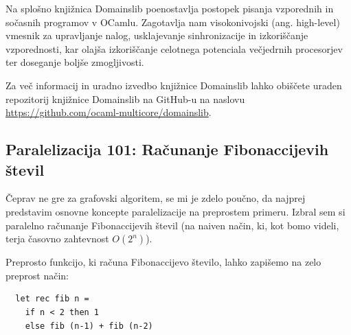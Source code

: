 \documentclass[mat1, tisk]{fmfdelo}
\begin{document}
Na splošno knjižnica Domainslib poenostavlja postopek pisanja vzporednih in sočasnih programov v OCamlu. 
Zagotavlja nam visokonivojski (ang. high-level) vmesnik za upravljanje nalog, usklajevanje sinhronizacije in izkoriščanje vzporednosti, 
kar olajša izkoriščanje celotnega potenciala večjedrnih procesorjev ter doseganje boljše zmogljivosti.

Za več informacij in uradno izvedbo knjižnice Domainslib lahko obiščete uraden repozitorij knjižnice Domainslib na
GitHub-u na naslovu \url{https://github.com/ocaml-multicore/domainslib}.


\subsection{Paralelizacija 101: Računanje Fibonaccijevih števil}

Čeprav ne gre za grafovski algoritem, se mi je zdelo poučno, da najprej predstavim osnovne koncepte paralelizacije na preprostem primeru. 
Izbral sem si paralelno računanje Fibonaccijevih števil (na naiven način, ki, kot bomo videli, terja časovno zahtevnost $O(2^n)$).

Preprosto funkcijo, ki računa Fibonaccijevo število, lahko zapišemo na zelo preprost način:

\begin{lstlisting}
  let rec fib n =
    if n < 2 then 1
    else fib (n-1) + fib (n-2)
\end{lstlisting}

\begin{figure}[htb]
  \centering
{}
\end{figure}
\end{document}
